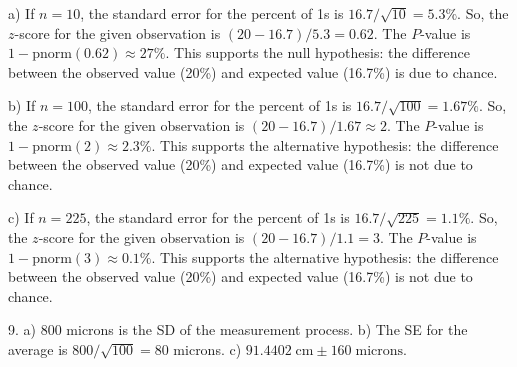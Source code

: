 \documentclass[10pt]{article}
\newcommand{\Z}{\hphantom{0}}
\begin{document}
a) If $n=10$, the standard error for the percent of 1s is $16.7/\sqrt{10}=5.3\%$.
So, the $z$-score for the given observation is $(20-16.7)/5.3 = 0.62$.  The $P$-value
is $1-\mbox{pnorm}(0.62)\approx 27\%$. This supports the null hypothesis:  the difference
between the observed value (20\%) and expected value (16.7\%) is due to chance.

b) If $n=100$, the standard error for the percent of 1s is $16.7/\sqrt{100}=1.67\%$.
So, the $z$-score for the given observation is $(20-16.7)/1.67 \approx 2$.  The $P$-value
is $1-\mbox{pnorm}(2)\approx 2.3\%$. This supports the alternative hypothesis:  the difference
between the observed value (20\%) and expected value (16.7\%) is not due to chance.

c) If $n=225$, the standard error for the percent of 1s is $16.7/\sqrt{225}=1.1\%$.
So, the $z$-score for the given observation is $(20-16.7)/1.1 =3$.  The $P$-value
is $1-\mbox{pnorm}(3)\approx 0.1\%$. This supports the alternative hypothesis:  the difference
between the observed value (20\%) and expected value (16.7\%) is not due to chance.


9. a) 800 microns is the SD of the measurement process.\Z
b) The SE for the average is $800/\sqrt{100} = 80$ microns.\Z
c) $91.4402\;\mbox{cm} \pm 160\; \mbox{microns}$.

\eject
\end{document}
